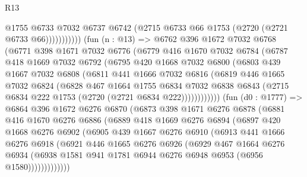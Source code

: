 \begin{lexlean}{R13}
\begin{coremodule}
                        @1755
                        @6733
                        @7032
                        @6737
                        @6742
                        (@2715 @6733 @66 @1753 (@2720 (@2721 @6733 @66)))))))))))
        (fun (n : @13) =>
        @6762
          @396
          @1672
          @7032
          @6768
          (@6771
            @398
            @1671
            @7032
            @6776
            (@6779
              @416
              @1670
              @7032
              @6784
              (@6787
                @418
                @1669
                @7032
                @6792
                (@6795
                  @420
                  @1668
                  @7032
                  @6800
                  (@6803
                    @439
                    @1667
                    @7032
                    @6808
                    (@6811
                      @441
                      @1666
                      @7032
                      @6816
                      (@6819
                        @446
                        @1665
                        @7032
                        @6824
                        (@6828
                          @467
                          @1664
                          @1755
                          @6834
                          @7032
                          @6838
                          @6843
                          (@2715 @6834 @222 @1753 (@2720 (@2721 @6834 @222))))))))))))
        (fun (d0 : @1777) =>
        @6864
          @396
          @1672
          @6276
          @6870
          (@6873
            @398
            @1671
            @6276
            @6878
            (@6881
              @416
              @1670
              @6276
              @6886
              (@6889
                @418
                @1669
                @6276
                @6894
                (@6897
                  @420
                  @1668
                  @6276
                  @6902
                  (@6905
                    @439
                    @1667
                    @6276
                    @6910
                    (@6913
                      @441
                      @1666
                      @6276
                      @6918
                      (@6921
                        @446
                        @1665
                        @6276
                        @6926
                        (@6929
                          @467
                          @1664
                          @6276
                          @6934
                          (@6938 @1581 @941 @1781 @6944 @6276 @6948 @6953 (@6956 @1580)))))))))))))

\end{coremodule}
\end{lexlean}
